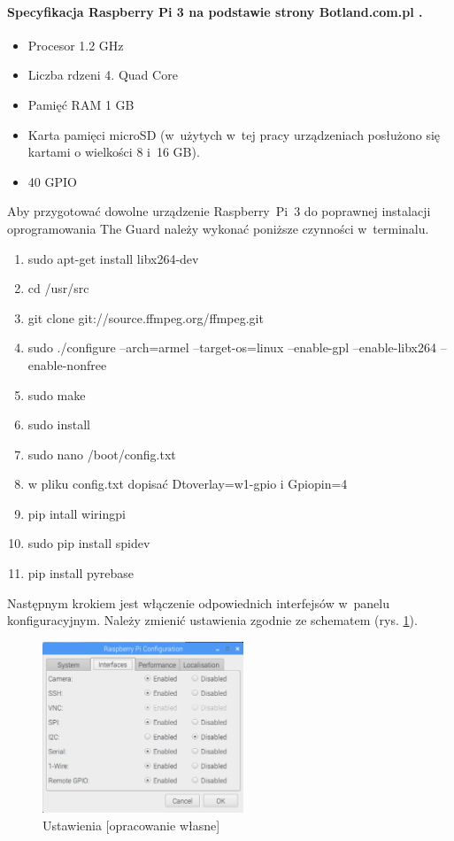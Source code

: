 \paragraph{Specyfikacja Raspberry Pi 3 na podstawie strony Botland.com.pl \cite{specyfikacja_rasp}.}
\begin{itemize} 
\item Procesor 1.2 GHz
\item Liczba rdzeni 4. Quad Core
\item Pamięć RAM 1 GB
\item Karta pamięci microSD (w~użytych w~tej pracy urządzeniach posłużono się kartami o wielkości 8 i~16 GB).
\item 40 GPIO
\end{itemize}
Aby przygotować dowolne urządzenie Raspberry~Pi~3 do poprawnej instalacji oprogramowania The Guard należy wykonać poniższe czynności w~terminalu.
\begin{enumerate} 
\item sudo apt-get install libx264-dev
\item cd /usr/src
\item git clone git://source.ffmpeg.org/ffmpeg.git
\item sudo ./configure --arch=armel --target-os=linux --enable-gpl --enable-libx264 --enable-nonfree
\item sudo make
\item sudo install
\item sudo nano /boot/config.txt
\item w pliku config.txt dopisać Dtoverlay=w1-gpio i Gpiopin=4
\item pip intall wiringpi
\item sudo pip install spidev
\item pip install pyrebase
\end{enumerate}
Następnym krokiem jest włączenie odpowiednich interfejsów w~panelu konfiguracyjnym. Należy zmienić ustawienia zgodnie ze schematem (rys. \ref{rs_settings}).
\begin{figure}[H]
	\centering
	\includegraphics[width=6cm]{RSettings}
	\caption{Ustawienia [opracowanie własne]}
	\label{rs_settings}
\end{figure}
